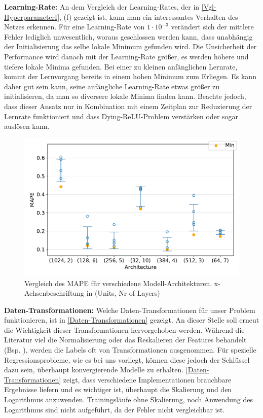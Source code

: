 \textbf{Learning-Rate:}
An dem Vergleich der Learning-Rates, der in \textsf{\autoref{Vgl-HyperparameterI}, (f)} gezeigt ist, kann man ein interessantes Verhalten des Netzes erkennen. Für eine Learning-Rate von $1 \cdot 10^{-3}$ verändert sich der mittlere Fehler lediglich unwesentlich, woraus geschlossen werden kann, dass unabhängig der Initialisierung das selbe lokale Minimum gefunden wird. Die Unsicherheit der Performance wird danach mit der Learning-Rate größer, es werden höhere und tiefere lokale Minima gefunden. Bei einer zu kleinen anfänglichen Lernrate, kommt der Lernvorgang bereits in einem hohen Minimum zum Erliegen. Es kann daher gut sein kann, seine anfängliche Learning-Rate etwas größer zu initialisieren, da man so diversere lokale Minima finden kann. Beachte jedoch, dass dieser Ansatz nur in Kombination mit einem Zeitplan zur Reduzierung der Lernrate funktioniert und dass \grqq Dying-ReLU\glqq-Problem verstärken oder sogar auslösen kann. 
\begin{figure}[bt!]
	\centering
	\includegraphics[width=13cm]{graphics/33-comp}
	\caption{Vergleich des MAPE für verschiedene Modell-Architekturen.
		x-Achsenbeschriftung in (Units, Nr of Layers)}
	\label{Vgl-Architekturen}
\end{figure}

\textbf{Daten-Transformationen:}
Welche Daten-Transformationen für unser Problem funktionieren, ist in \textsf{\autoref{Daten-Transformationen}} gezeigt. An dieser Stelle soll erneut die Wichtigkeit dieser Transformationen hervorgehoben werden. Während die Literatur viel die Normalisierung oder das Reskalieren der Features behandelt (Bsp. \cite{FN, feature-scaling}), werden die Labels oft von Transformationen ausgenommen. Für spezielle Regressionsprobleme, wie es bei uns vorliegt, können diese jedoch der Schlüssel dazu sein, überhaupt konvergierende Modelle zu erhalten. \textsf{\autoref{Daten-Transformationen}} zeigt, dass verschiedene Implementationen brauchbare Ergebnisse liefern und es wichtiger ist, überhaupt die Skalierung und den Logarithmus anzuwenden. Trainingsläufe ohne Skalierung, noch Anwendung des Logarithmus sind nicht aufgeführt, da der Fehler nicht vergleichbar ist.


